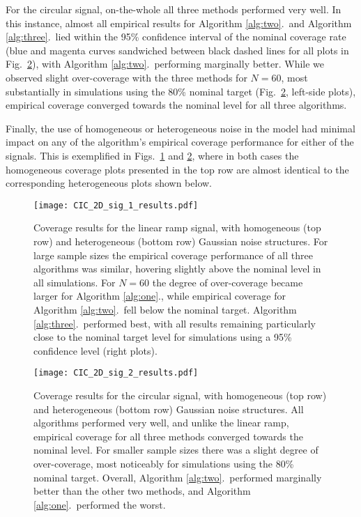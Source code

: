 For the circular signal, on-the-whole all three methods performed very well. In this instance, almost all empirical results for Algorithm \ref{alg:two}.\ and Algorithm \ref{alg:three}.\ lied within the 95\% confidence interval of the nominal coverage rate (blue and magenta curves sandwiched between black dashed lines for all plots in Fig.\ \ref{fig:Cohen_2D_sig_2_results}), with Algorithm \ref{alg:two}.\ performing marginally better. While we observed slight over-coverage with the three methods for $N = 60$, most substantially in simulations using the 80\% nominal target (Fig.\ \ref{fig:Cohen_2D_sig_2_results}, left-side plots), empirical coverage converged towards the nominal level for all three algorithms.

Finally, the use of homogeneous or heterogeneous noise in the model had minimal impact on any of the algorithm's empirical coverage performance for either of the signals. This is exemplified in Figs.\ \ref{fig:Cohen_2D_sig_1_results} and \ref{fig:Cohen_2D_sig_2_results}, where in both cases the homogeneous coverage plots presented in the top row are almost identical to the corresponding heterogeneous plots shown below. 

\begin{figure}[!htbp]
\hspace*{-3.0cm}
\centering
    \texttt{[image: CIC\_2D\_sig\_1\_results.pdf]}
\caption{Coverage results for the linear ramp signal, with homogeneous (top row) and heterogeneous (bottom row) Gaussian noise structures. For large sample sizes the empirical coverage performance of all three algorithms was similar, hovering slightly above the nominal level in all simulations. For $N = 60$ the degree of over-coverage became larger for Algorithm \ref{alg:one}., while empirical coverage for Algorithm \ref{alg:two}.\ fell below the nominal target. Algorithm \ref{alg:three}.\ performed best, with all results remaining particularly close to the nominal target level for simulations using a 95\% confidence level (right plots).}
\label{fig:Cohen_2D_sig_1_results}
\end{figure}

\begin{figure}[!htbp]
\hspace*{-3.0cm}
\centering
    \texttt{[image: CIC\_2D\_sig\_2\_results.pdf]}
\caption{Coverage results for the circular signal, with homogeneous (top row) and heterogeneous (bottom row) Gaussian noise structures. All algorithms performed very well, and unlike the linear ramp, empirical coverage for all three methods converged towards the nominal level. For smaller sample sizes there was a slight degree of over-coverage, most noticeably for simulations using the 80\% nominal target. Overall, Algorithm \ref{alg:two}.\ performed marginally better than the other two methods, and Algorithm \ref{alg:one}.\ performed the worst.}
\label{fig:Cohen_2D_sig_2_results}
\end{figure}

